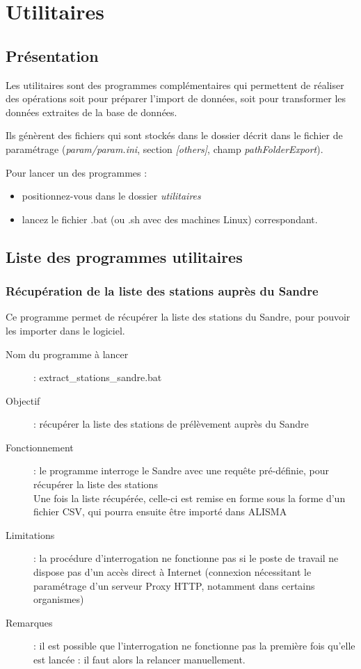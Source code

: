 \chapter{Utilitaires}

\section{Présentation}
Les utilitaires sont des programmes complémentaires qui permettent de réaliser des opérations soit pour préparer l'import de données, soit pour transformer les données extraites de la base de données.

Ils génèrent des fichiers qui sont stockés dans le dossier décrit dans le fichier de paramétrage (\textit{param/param.ini}, section \textit{[others]}, champ \textit{pathFolderExport}).

Pour lancer un des programmes :
\begin{itemize}
\item positionnez-vous dans le dossier \textit{utilitaires}
\item lancez le fichier .bat (ou .sh avec des machines Linux) correspondant.
\end{itemize}

\section{Liste des programmes utilitaires}
\subsection{Récupération de la liste des stations auprès du Sandre}
Ce programme permet de récupérer la liste des stations du Sandre, pour pouvoir les importer dans le logiciel.

\begin{description}
\item [Nom du programme à lancer] : {extract\_stations\_sandre.bat}
\item [Objectif] : récupérer la liste des stations de prélèvement auprès du Sandre
\item [Fonctionnement] : le programme interroge le Sandre avec une requête pré-définie, pour récupérer la liste des stations\\
Une fois la liste récupérée, celle-ci est remise en forme sous la forme d'un fichier CSV, qui pourra ensuite être importé dans ALISMA
\item [Limitations] : la procédure d'interrogation ne fonctionne pas si le poste de travail ne dispose pas d'un accès direct à Internet (connexion nécessitant le paramétrage d'un serveur Proxy HTTP, notamment dans certains organismes)
\item [Remarques] : il est possible que l'interrogation ne fonctionne pas la première fois qu'elle est lancée : il faut alors la relancer manuellement.
\end{description}


